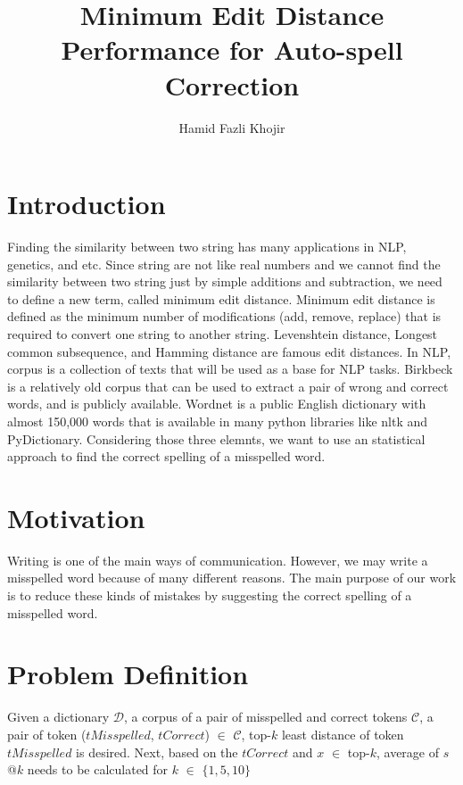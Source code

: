 \documentclass[sigconf]{acmart}
\begin{document}
\title{Minimum Edit Distance Performance for Auto-spell Correction}
\author{Hamid Fazli Khojir}

\maketitle

\section{Introduction}
Finding the similarity between two string has many applications in NLP, genetics, and etc. Since string are not like real numbers and we cannot find the similarity between two string just by simple additions and subtraction, we need to define a new term, called minimum edit distance. Minimum edit distance is defined as the minimum number of modifications (add, remove, replace) that is required to convert one string to another string. Levenshtein distance, Longest common subsequence, and Hamming distance are famous edit distances. In NLP, corpus is a collection of texts that will be used as a base for NLP tasks. Birkbeck is a relatively old corpus that can be used to extract a pair of wrong and correct words, and is publicly available.
Wordnet is a public English dictionary with almost 150,000 words that is available in many python libraries like nltk and PyDictionary. Considering those three elemnts, we want to use an statistical approach to find the correct spelling of a misspelled word. 
\section{Motivation}
Writing is one of the main ways of communication. However, we may write a misspelled word because of many different reasons. The main purpose of our work is to reduce these kinds of mistakes by suggesting the correct spelling of a misspelled word.
\section{Problem Definition}
Given a dictionary $\mathcal{D}$, a corpus of a pair of misspelled and correct tokens $\mathcal{C}$, a pair of token ($tMisspelled$, $tCorrect$) $\in$ $\mathcal{C}$, top-$k$ least distance of token $tMisspelled$ is desired.
Next, based on the $tCorrect$ and $x$ $\in$ top-$k$, average of $s$@$k$  needs to be calculated for $k$ $\in$ $\{1, 5, 10\}$
\end{document}
